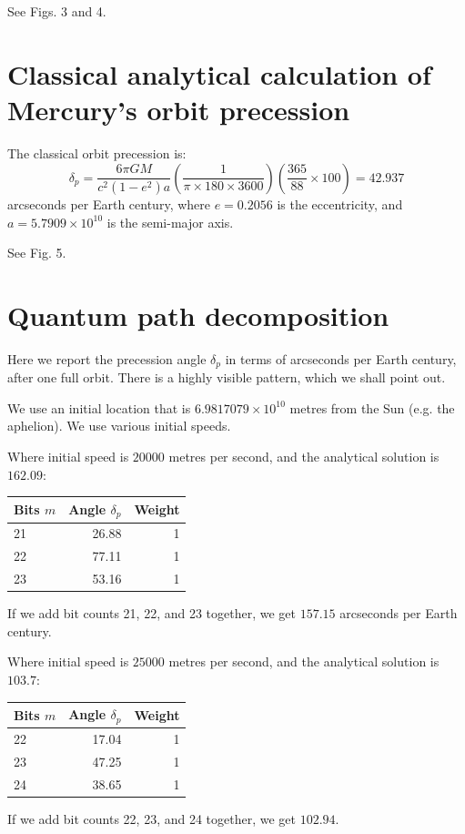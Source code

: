 \documentclass[12pt]{article}
\begin{document}
See Figs. 3 and 4.





\section{Classical analytical calculation of Mercury's orbit precession}

The classical orbit precession is:
\begin{equation}
\label{delta_p}
\delta_{p} = \frac{6 \pi G M}{c^2 (1 - e^2) a} \left( \frac{1}{ \pi \times 180 \times 3600} \right) \left( \frac{365}{88} \times 100 \right) = 42.937
\end{equation}
arcseconds per Earth century, where $e = 0.2056$ is the eccentricity, and $a = 5.7909 \times 10^{10}$ is the semi-major axis.

See Fig. 5.


\section{Quantum path decomposition}

Here we report the precession angle $\delta_{p}$ in terms of arcseconds per Earth century, after one full orbit.
There is a highly visible pattern, which we shall point out.

We use an initial location that is $6.9817079 \times 10^{10}$ metres from the Sun (e.g. the aphelion).
We use various initial speeds.

Where initial speed is $20000$ metres per second, and the analytical solution is $162.09$:
\begin{center}
\begin{tabular}{| l | r | r |}
  \hline
Bits $m$ & Angle $\delta_{p}$ & Weight\\
\hline
\hline
21 & 26.88 & 1 \\
22 & 77.11 & 1\\
23 & 53.16 & 1 \\
  \hline  
\end{tabular}
\end{center}
If we add bit counts 21, 22, and 23 together, we get $157.15$ arcseconds per Earth century.

Where initial speed is $25000$ metres per second, and the analytical solution is $103.7$:
\begin{center}
\begin{tabular}{| l | r | r |}
  \hline
Bits $m$ & Angle $\delta_{p}$ & Weight\\
\hline
\hline
22 & 17.04 & 1\\
23 & 47.25 & 1\\
24 & 38.65 & 1\\
  \hline  
\end{tabular}
\end{center}
If we add bit counts 22, 23, and 24 together, we get $102.94$.
\end{document}
